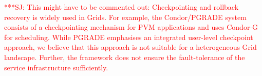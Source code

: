 \documentclass[conference,final]{IEEEtran}
\newcommand{\up}{\vspace*{-1em}}
\newcommand{\alnote}[1]{ {\textcolor{blue} { ***AL: #1 }}}
\newcommand{\jhanote}[1]{ {\textcolor{red} { ***SJ: #1 }}}
\newcommand{\alnote}[1]{}
\newcommand{\jhanote}[1]{}
\begin{document}
%                                                                                  
%                                                 
     
\up
{}

\up
\jhanote{This might have to be commented out: Checkpointing and
  rollback recovery is widely used in Grids. For example, the
  Condor/PGRADE system~\cite{DBLP:conf/eagc/KovacsK04} consists of a
  checkpointing mechanism for PVM applications and uses
  Condor-G~\cite{citeulike:291860} for scheduling.  While PGRADE
  emphasises an integrated user-level checkpoint approach, we believe
  that this approach is not suitable for a heterogeneous Grid
  landscape. Further, the framework does not ensure the
  fault-tolerance of the service infrastructure sufficiently.}
                                 




\end{document}
